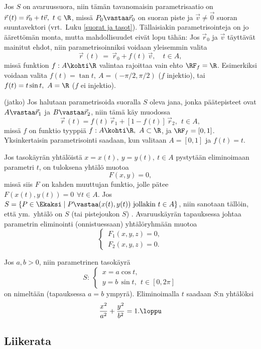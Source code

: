 \begin{Exa} Jos $S$ on avaruussuora, niin tämän tavanomaisin parametrisaatio on 
$\vec{r}\,(t) = \vec{r}_0 + t \vec{v},\ t \in \R$, missä $P_0 \vastaa \vec{r}_0$ on suoran
piste ja $\vec{v} \neq \vec{0}$ suoran suuntavektori (vrt.\ Luku \ref{suorat ja tasot}).
Tällaisiakin parametrisointeja on jo äärettömän monta, mutta mahdollisuudet eivät lopu tähän:
Jos $\vec{r}_0$ ja $\vec{v}$ täyttävät mainitut ehdot, niin parametrisoinniksi voidaan
yleisemmin valita
\[ 
\vec{r}\,(t)\ =\ \vec{r}_0 + f(t)\,\vec{v}, \quad t \in A, 
\]
missä funktion $f: A \kohti \R$ valintaa rajoittaa vain ehto $\RF_f = \R$. Esimerkiksi voidaan 
valita $f(t) = \tan t,\ A = (-\pi/2,\pi/2)$ ($f$ injektio), tai $f(t) = t \sin t,\ A = \R$ 
($f$ ei injektio).  \loppu \end{Exa}
\jatko \begin{Exa} (jatko) Jos halutaan parametrisoida suoralla $S$ oleva jana, jonka 
päätepisteet ovat $A \vastaa \vec{r}_1$ ja $B \vastaa \vec{r}_2$, niin tämä käy muodossa
\[ 
\vec{r}\,(t) = f(t)\,\vec{r}_1 + [1-f(t)]\,\vec{r}_2,\ \ t \in A, 
\]
missä $f$ on funktio tyyppiä $f: A \kohti \R,\ A \subset \R$, ja $\RF_f = [0,1]$.
Yksinkertaisin parametrisointi saadaan, kun valitaan $A = [0,1]$ ja $f(t) = t$. \loppu 
\end{Exa}
Jos tasokäyrän yhtälöistä $x = x(t),\ y = y(t),\ t \in A$ pystytään eliminoimaan parametri
$t$, on tuloksena yhtälö muotoa
\[ 
F(x,y) = 0, 
\]
missä siis $F$ on kahden muuttujan funktio, jolle pätee $F(x(t),y(t)) = 0\,\ \forall t \in A$.
Jos $S = \{P \in \Ekaksi \mid P \vastaa (x(t),y(t))\ \text{jollakin}\ t \in A\}$, niin
sanotaan tällöin, että ym.\ yhtälö on  $S$ (tai pistejoukon $S$) .
Avaruuskäyrän tapauksessa johtaa parametrin eliminointi (onnistuessaan) yhtälöryhmään muotoa
\[ 
\begin{cases} \,F_1(x,y,z) = 0, \\ \,F_2(x,y,z) = 0. \end{cases} 
\]
\begin{Exa} Jos $a,b>0$, niin parametrinen tasokäyrä
\[ 
S:\ \begin{cases} \,x = a\cos t, \\ \,y = b\,\sin t,\ \ t \in [0,2\pi] \end{cases} 
\]
on nimeltään  (tapauksessa $a=b$ ympyrä). Eliminoimalla $t$ saadaan $S$:n
yhtälöksi
\[ 
\frac{x^2}{a^2} + \frac{y^2}{b^2} = 1. \loppu
\]
\end{Exa}

\subsection*{Liikerata}

